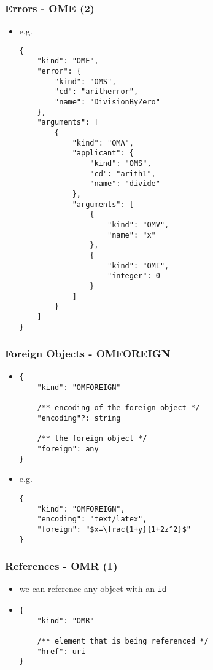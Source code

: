 \documentclass[usenames,dvipsnames]{beamer}
\begin{document}
\begin{frame}[fragile]
    \frametitle{Errors - OME (2)}
    \begin{itemize}
        \item e.g. \begin{lstlisting}
{
    "kind": "OME",
    "error": {
        "kind": "OMS",
        "cd": "aritherror",
        "name": "DivisionByZero"
    },
    "arguments": [
        {
            "kind": "OMA",
            "applicant": {
                "kind": "OMS",
                "cd": "arith1",
                "name": "divide"
            },
            "arguments": [
                {
                    "kind": "OMV",
                    "name": "x"
                },
                {
                    "kind": "OMI",
                    "integer": 0
                }
            ]
        }
    ]
}
\end{lstlisting}
    \end{itemize}
\end{frame}

\begin{frame}[fragile]
    \frametitle{Foreign Objects - OMFOREIGN}
    \begin{itemize}
        \item
\begin{lstlisting}
{
    "kind": "OMFOREIGN"

    /** encoding of the foreign object */
    "encoding"?: string

    /** the foreign object */
    "foreign": any
}
\end{lstlisting}
        \item e.g.
\begin{lstlisting}
{
    "kind": "OMFOREIGN",
    "encoding": "text/latex",
    "foreign": "$x=\frac{1+y}{1+2z^2}$"
}
\end{lstlisting}
    \end{itemize}
\end{frame}


\begin{frame}[fragile]
    \frametitle{References - OMR (1)}
    \begin{itemize}
        \item we can reference any object with an \texttt{id}
        \item
\begin{lstlisting}
{
    "kind": "OMR"

    /** element that is being referenced */
    "href": uri
}
\end{lstlisting}
    \end{itemize}
\end{frame}
\end{document}
